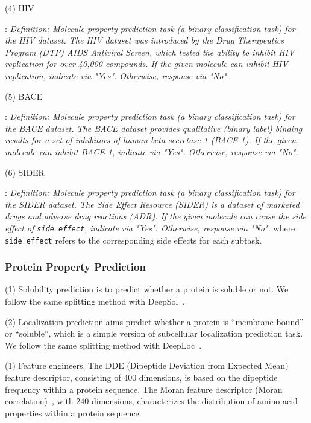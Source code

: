 \documentclass[11pt]{article}
\begin{document}
\noindent(4) HIV

:
\textit{Definition: Molecule property prediction task (a binary classification task) for the HIV dataset. The HIV dataset was introduced by the Drug Therapeutics Program (DTP) AIDS Antiviral Screen, which tested the ability to inhibit HIV replication for over 40,000 compounds. If the given molecule can inhibit HIV replication, indicate via "Yes". Otherwise, response via "No".}

\noindent(5) BACE

:
\textit{Definition: Molecule property prediction task (a binary classification task) for the BACE dataset. The BACE dataset provides qualitative (binary label) binding results for a set of inhibitors of human beta-secretase 1 (BACE-1). If the given molecule can inhibit BACE-1, indicate via "Yes". Otherwise, response via "No".}

\noindent(6) SIDER

:
\textit{Definition: Molecule property prediction task (a binary classification task) for the SIDER dataset. The Side Effect Resource (SIDER) is a dataset of marketed drugs and adverse drug reactions (ADR). If the given molecule can cause the side effect of \texttt{side effect}, indicate via "Yes". Otherwise, response via "No".} where \texttt{side effect} refers to the corresponding side effects for each subtask.

\subsubsection{Protein Property Prediction}
\label{sec:protein_property_detail}

\noindent(1) Solubility prediction is to predict whether a protein is soluble or not. We follow the same splitting method with DeepSol~\citep{DBLP:journals/bioinformatics/KhuranaRKCBM18}.

\noindent(2) Localization prediction aims predict whether a protein is ``membrane-bound'' or ``soluble'', which is a simple version of subcellular localization prediction task. We follow the same splitting method with DeepLoc~\citep{DBLP:journals/bioinformatics/ArmenterosSSNW17}.



\noindent(1) Feature engineers. The DDE (Dipeptide Deviation from Expected Mean)~\citep{saravanan2015harnessing} feature descriptor, consisting of 400 dimensions, is based on the dipeptide frequency within a protein sequence.
The Moran feature descriptor (Moran correlation)~\citep{feng2000prediction}, with 240 dimensions, characterizes the distribution of amino acid properties within a protein sequence. 
\end{document}
